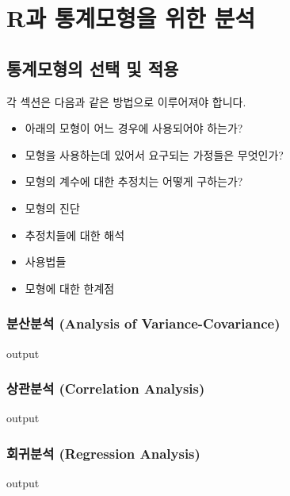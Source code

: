 \documentclass{book}
\begin{document}
%
%
%
%

\part{R과 통계모형을 위한 분석}


\chapter{통계모형의 선택 및 적용}

각 섹션은 다음과 같은 방법으로 이루어져야 합니다. 
\begin{itemize}
\item 아래의 모형이 어느 경우에 사용되어야 하는가?
\item 모형을 사용하는데 있어서 요구되는 가정들은 무엇인가?
\item 모형의 계수에 대한 추정치는 어떻게 구하는가?
\item 모형의 진단
\item 추정치들에 대한 해석
\item 사용법들 
\item 모형에 대한 한계점
\end{itemize}

\section{분산분석 (Analysis of Variance-Covariance)}
\begin{Schunk}
\begin{Soutput}
output
\end{Soutput}
\end{Schunk}

\section{상관분석 (Correlation Analysis) }
\begin{Schunk}
\begin{Soutput}
output
\end{Soutput}
\end{Schunk}

\section{회귀분석 (Regression Analysis) }
\begin{Schunk}
\begin{Soutput}
output
\end{Soutput}
\end{Schunk}
\end{document}
